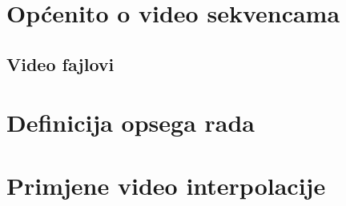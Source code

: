 \section{Op\'{c}enito o video sekvencama}
\lipsum[1-4]

\subsection{Video fajlovi}
\lipsum[5]

\section{Definicija opsega rada}
\lipsum[6]

\section{Primjene video interpolacije}
\lipsum[7-9]